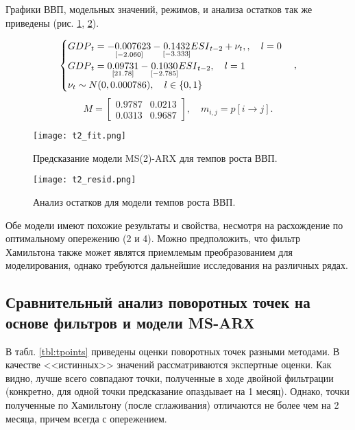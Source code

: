 \documentclass[a4paper,14pt]{extreport}
\begin{document}
	Графики ВВП, модельных значений, режимов, и анализа остатков так же приведены (рис. \ref{fig:hp-fitcompare2}, \ref{fig:hp-residcompare2}).
	
	
	{
		\begin{equation}
		\begin{cases}
		{GDP}_{t} = 
		\underset{[-2.060]}{-0.007623} 
		- \underset{[-3.333]}{0.1432} {ESI}_{t-2}
		+ \nu_{t} , \space 
		, \quad l=0 \\
		{GDP}_{t} = 
		\underset{[21.78]}{0.09731}
		- \underset{[-2.785]}{0.1030} {ESI}_{t-2}
		, \quad l=1 \\
		\nu_{t} \sim N(0, 0.000786) , \quad l \in \{0, 1\}
		\end{cases},
		\label{eq:ms2varx}
		\end{equation}
		\begin{equation}
		M = 
		\begin{bmatrix}
		0.9787 & 0.0213 \\
		0.0313 & 0.9687
		\end{bmatrix}
		, \quad m_{i,j} = p[i \rightarrow j]
		.
		\label{eq:ms2varx_m}
		\end{equation}		
	}
	
	{
		\begin{figure}
			\texttt{[image: t2\_fit.png]}
			\caption{Предсказание модели MS(2)-ARX для темпов роста ВВП.}
			\label{fig:hp-fitcompare2}
		\end{figure}
		\begin{figure}
			\texttt{[image: t2\_resid.png]}
			\caption{Анализ остатков для модели темпов роста ВВП.}
			\label{fig:hp-residcompare2}
		\end{figure}
	}
	
	
	Обе модели имеют похожие результаты и свойства, несмотря на расхождение по оптимальному опережению (2 и 4). Можно предположить, что фильтр Хамильтона также может являтся приемлемым преобразованием для моделирования, однако требуются дальнейшие исследования на различных рядах.
	
	
	\subsection{Сравнительный анализ поворотных точек на основе фильтров и модели MS-ARХ}
	
	
	В табл. \ref{tbl:tpoints} приведены оценки поворотных точек разными методами. В качестве <<истинных>> значений рассматриваются экспертные оценки. Как видно, лучше всего совпадают точки, полученные в ходе двойной фильтрации (конкретно, для одной точки предсказание опаздывает на 1 месяц). Однако, точки полученные по Хамильтону (после сглаживания) отличаются не более чем на 2 месяца, причем всегда с опережением.
	
\end{document}

